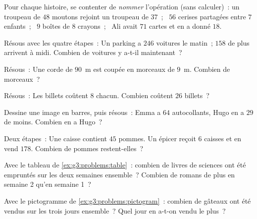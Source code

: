 \begin{exercise}[$\star$]\label{exo:g3:problems:1}
Pour chaque histoire, se contenter de \emph{nommer} l'opération
(sans calculer)~: un troupeau de $48$ moutons rejoint un troupeau de
$37$~; \ $56$ cerises partagées entre $7$ enfants~; \ $9$ boîtes
de $8$ crayons~; \ Ali avait $71$ cartes et en a donné $18$.
\end{exercise}

\begin{exercise}[$\star$]\label{exo:g3:problems:2}
Résous avec les quatre étapes~: \guillemotleft{} Un parking a
$246$ voitures le matin~; $158$ de plus arrivent à midi. Combien
de voitures y a-t-il maintenant~? \guillemotright{}
\end{exercise}

\begin{exercise}[$\star$]\label{exo:g3:problems:3}
Résous~: \guillemotleft{} Une corde de $90$~m est coupée en
morceaux de $9$~m. Combien de morceaux~? \guillemotright{}
\end{exercise}

\begin{exercise}[$\star$]\label{exo:g3:problems:4}
Résous~: \guillemotleft{} Les billets coûtent $8$ chacun. Combien
coûtent $26$ billets~? \guillemotright{}
\end{exercise}

\begin{exercise}[$\star$]\label{exo:g3:problems:5}
Dessine une image en barres, puis résous~: \guillemotleft{} Emma a
$64$ autocollants, Hugo en a $29$ de moins. Combien en a Hugo~?
\guillemotright{}
\end{exercise}

\begin{exercise}[$\star$]\label{exo:g3:problems:6}
Deux étapes~: \guillemotleft{} Une caisse contient $45$ pommes. Un
épicer reçoit $6$ caisses et en vend $178$. Combien de pommes
restent-elles~? \guillemotright{}
\end{exercise}

\begin{exercise}[$\star$]\label{exo:g3:problems:7}
Avec le tableau de \cref{ex:g3:problems:table}~: combien de livres de
sciences ont été empruntés sur les deux semaines ensemble~?
Combien de romans de plus en semaine 2 qu'en semaine 1~?
\end{exercise}

\begin{exercise}[$\star$]\label{exo:g3:problems:8}
Avec le pictogramme de \cref{ex:g3:problems:pictogram}~: combien de
gâteaux ont été vendus sur les trois jours ensemble~? Quel jour
en a-t-on vendu le plus~?
\end{exercise}

